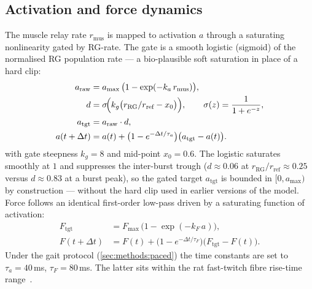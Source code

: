 \subsection{Activation and force dynamics}\label{sec:methods:muscle}
The muscle relay rate $r_{\text{mus}}$ is mapped to activation $a$
through a saturating nonlinearity gated by RG-rate. The gate is a smooth
logistic (sigmoid) of the normalised RG population rate --- a
bio-plausible soft saturation in place of a hard clip:
\begin{align}
  a_{\text{raw}} &= a_{\max} \, \bigl(1 - \exp(-k_a \, r_{\text{mus}})\bigr), \label{eq:araw}\\
  d &= \sigma\!\Bigl(k_g\bigl(r_{\text{RG}}/r_{\text{ref}} - x_0\bigr)\Bigr),
       \qquad \sigma(z)=\frac{1}{1+e^{-z}}, \label{eq:gate}\\
  a_{\text{tgt}} &= a_{\text{raw}} \cdot d, \label{eq:atgt}\\
  a(t+\Delta t) &= a(t) + \bigl(1 - e^{-\Delta t/\tau_a}\bigr)\bigl(a_{\text{tgt}} - a(t)\bigr).
  \label{eq:alp}
\end{align}
with gate steepness $k_g=8$ and mid-point $x_0=0.6$. The logistic
saturates smoothly at $1$ and suppresses the inter-burst trough
($d\approx0.06$ at $r_{\text{RG}}/r_{\text{ref}}\approx0.25$ versus
$d\approx0.83$ at a burst peak), so the gated target $a_{\text{tgt}}$ is
bounded in $[0,a_{\max})$ by construction --- without the hard clip used
in earlier versions of the model.
Force follows an identical first-order low-pass driven by a saturating
function of activation:
\begin{align}
  F_{\text{tgt}} &= F_{\max} \, \bigl(1 - \exp(-k_F \, a)\bigr),\\
  F(t+\Delta t) &= F(t) + \bigl(1 - e^{-\Delta t/\tau_F}\bigr)\bigl(F_{\text{tgt}} - F(t)\bigr).
\end{align}
Under the gait protocol (\autoref{sec:methods:paced}) the time
constants are set to $\tau_a=40$\,ms, $\tau_F=80$\,ms. The latter
sits within the rat fast-twitch fibre rise-time
range~\cite{zajac1989,winters1995}.

